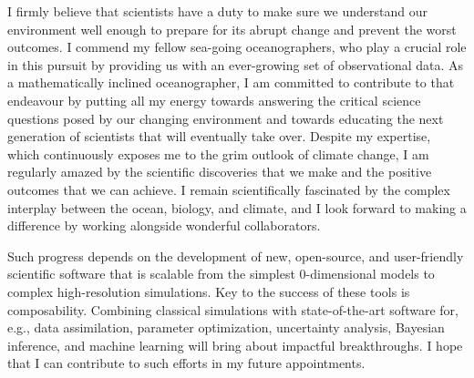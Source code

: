 I firmly believe that scientists have a duty to make sure we understand our environment well enough to prepare for its abrupt change and prevent the worst outcomes.
I commend my fellow sea-going oceanographers, who play a crucial role in this pursuit by providing us with an ever-growing set of observational data.
As a mathematically inclined oceanographer, I am committed to contribute to that endeavour by putting all my energy towards answering the critical science questions posed by our changing environment and towards educating the next generation of scientists that will eventually take over.
Despite my expertise, which continuously exposes me to the grim outlook of climate change, I am regularly amazed by the scientific discoveries that we make and the positive outcomes that we can achieve.
I remain scientifically fascinated by the complex interplay between the ocean, biology, and climate, and I look forward to making a difference by working alongside wonderful collaborators.

Such progress depends on the development of new, open-source, and user-friendly scientific software that is scalable from the simplest 0-dimensional models to complex high-resolution simulations.
Key to the success of these tools is composability.
Combining classical simulations with state-of-the-art software for, e.g., data assimilation, parameter optimization, uncertainty analysis, Bayesian inference, and machine learning will bring about impactful breakthroughs.
I hope that I can contribute to such efforts in my future appointments.
